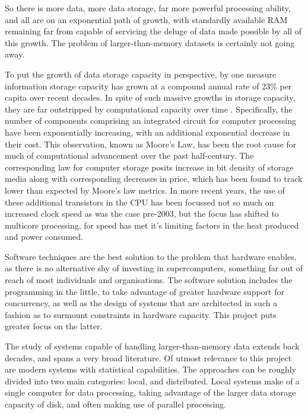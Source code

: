 So there is more data, more data storage, far more powerful processing ability, and all are on an exponential path of growth, with standardly available RAM remaining far from capable of servicing the deluge of data made possible by all of this growth\cite{sutter2005free}.
The problem of larger-than-memory datasets is certainly not going away.

To put the growth of data storage capacity in perspective, by one measure information storage capacity has grown at a compound annual rate of 23\% per capita over recent decades\cite{hilbert2011world}.
In spite of such massive growths in storage capacity, they are far outstripped by computational capacity over time \cite{fontana2018moore}.
Specifically, the number of components comprising an integrated circuit for computer processing have been exponentially increasing, with an additional exponential decrease in their cost\cite{moore1975progress}.
This observation, known as Moore's Law, has been the root cause for much of computational advancement over the past half-century.
The corresponding law for computer storage posits increase in bit density of storage media along with corresponding decreases in price, which has been found to track lower than expected by Moore's law metrics\cite{hilbert2011world}.
In more recent years, the use of these additional transistors in the CPU has been focussed not so much on increased clock speed as was the case pre-2003, but the focus has shifted to multicore processing, for speed has met it's limiting factors in the heat produced and power consumed\cite{sutter2005free}.

Software techniques are the best solution to the problem that hardware enables, as there is no alternative shy of investing in supercomputers, something far out of reach of most individuals and organisations.
The software solution includes the programming in the little, to take advantage of greater hardware support for concurrency, as well as the design of systems that are architected in such a fashion as to surmount constraints in hardware capacity.
This project puts greater focus on the latter.

The study of systems capable of handling larger-than-memory data extends back decades, and spans a very broad literature.
Of utmost relevance to this project are modern systems with statistical capabilities.
The approaches can be roughly divided into two main categories: local, and distributed.
Local systems make of a single computer for data processing, taking advantage of the larger data storage capacity of disk, and often making use of parallel processing.

